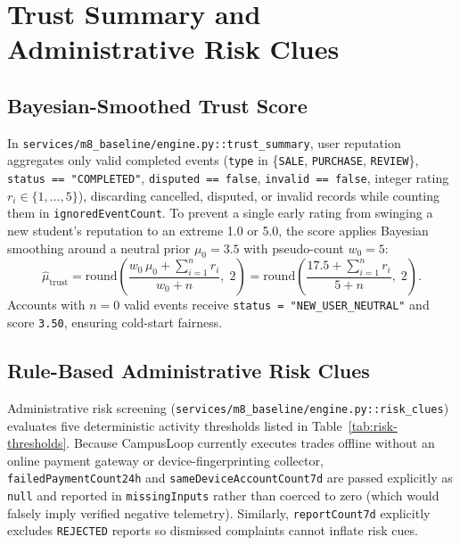 \section{Trust Summary and Administrative Risk Clues}
\label{sec:ai-trust-risk}

\subsection{Bayesian-Smoothed Trust Score}

In \texttt{services/m8\_baseline/engine.py::trust\_summary}, user reputation aggregates only valid completed events (\texttt{type} in \{\texttt{SALE}, \texttt{PURCHASE}, \texttt{REVIEW}\}, \texttt{status == "COMPLETED"}, \texttt{disputed == false}, \texttt{invalid == false}, integer rating $r_i \in \{1,\dots,5\}$), discarding cancelled, disputed, or invalid records while counting them in \texttt{ignoredEventCount}. To prevent a single early rating from swinging a new student's reputation to an extreme 1.0 or 5.0, the score applies Bayesian smoothing around a neutral prior $\mu_0 = 3.5$ with pseudo-count $w_0 = 5$:
\begin{equation}
  \hat{\mu}_{\text{trust}} = \text{round}\!\left(\frac{w_0\,\mu_0 + \sum_{i=1}^{n} r_i}{w_0 + n},\; 2\right) = \text{round}\!\left(\frac{17.5 + \sum_{i=1}^{n} r_i}{5 + n},\; 2\right).
  \label{eq:trust-bayes}
\end{equation}
Accounts with $n = 0$ valid events receive \texttt{status = "NEW\_USER\_NEUTRAL"} and score \texttt{3.50}, ensuring cold-start fairness.

\subsection{Rule-Based Administrative Risk Clues}

Administrative risk screening (\texttt{services/m8\_baseline/engine.py::risk\_clues}) evaluates five deterministic activity thresholds listed in Table~\ref{tab:risk-thresholds}. Because CampusLoop currently executes trades offline without an online payment gateway or device-fingerprinting collector, \texttt{failedPaymentCount24h} and \texttt{sameDeviceAccountCount7d} are passed explicitly as \texttt{null} and reported in \texttt{missingInputs} rather than coerced to zero (which would falsely imply verified negative telemetry). Similarly, \texttt{reportCount7d} explicitly excludes \texttt{REJECTED} reports so dismissed complaints cannot inflate risk cues.

